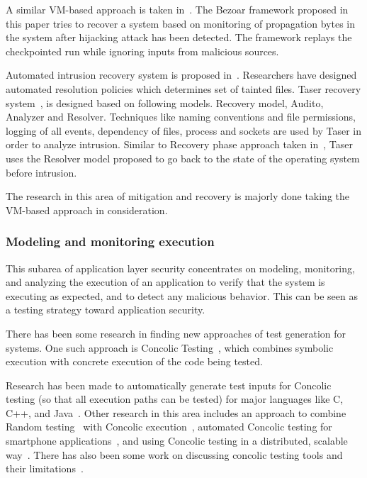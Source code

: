 \documentclass[11pt,letterpaper]{article}
\begin{document}
A similar VM-based approach is taken in~\cite{oliveira2008b}. The Bezoar framework proposed in this paper tries to recover a system based on monitoring of propagation bytes in the system after hijacking attack has been detected. The framework replays the checkpointed run while ignoring inputs from malicious sources.

Automated intrusion recovery system is proposed in~\cite{goel2005b}. Researchers have designed automated resolution policies which determines set of tainted files. Taser recovery system~\cite{goel2005b}, is designed based on following models. Recovery model, Audito, Analyzer and Resolver. Techniques like naming conventions and file permissions, logging of all events, dependency of files, process and sockets are used by Taser in order to analyze intrusion. Similar to Recovery phase approach taken in~\cite{zhang2009b}, Taser uses the Resolver model proposed to go back to the state of the operating system before intrusion.

The research in this area of mitigation and recovery is majorly done taking the VM-based approach in consideration. 

\subsubsection{Modeling and monitoring execution}
This subarea of application layer security concentrates on modeling, monitoring, and analyzing the execution of an application to verify that the system is executing as expected, and to detect any malicious behavior. This can be seen as a testing strategy toward application security.

There has been some research in finding new approaches of test generation for systems. One such approach is Concolic Testing~\cite{sen2007concolic}, which combines symbolic execution with concrete execution of the code being tested.

Research has been made to automatically generate test inputs for Concolic testing (so that all execution paths can be tested) for major languages like C, C++, and Java~\cite{garg2013, jayaraman2009, sen2005}. Other research in this area includes an approach to combine Random testing~\cite{bird1983automatic} with Concolic execution~\cite{majumdar2007}, automated Concolic testing for smartphone applications~\cite{anand2012automated}, and using Concolic testing in a distributed, scalable way~\cite{kim2012scalable}. There has also been some work on discussing concolic testing tools and their limitations~\cite{qu2011}.
\end{document}
